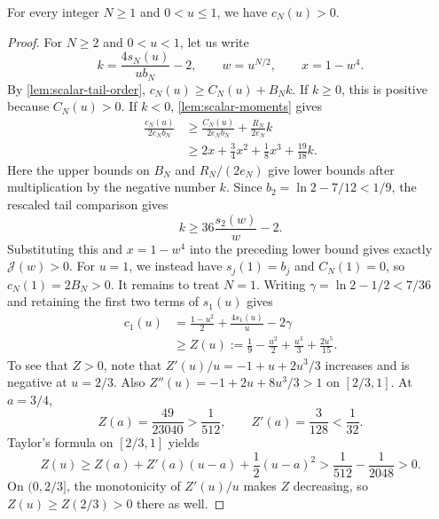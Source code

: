 \begin{lemma}
\label{lem:scalar-coefficients}
For every integer $N\ge1$ and $0<u\le1$, we have $c_N(u)>0$.
\end{lemma}
\begin{proof}
For $N\ge2$ and $0<u<1$, let us write
\begin{equation*}
  k=\frac{4s_N(u)}{u b_N}-2,\qquad
  w=u^{N/2},\qquad x=1-w^4.
\end{equation*}
By \autoref{lem:scalar-tail-order},
$c_N(u)\ge C_N(u)+B_Nk$.
If $k\ge0$, this is positive because $C_N(u)>0$.
If $k<0$, \autoref{lem:scalar-moments} gives
\begin{align*}
  \frac{c_N(u)}{2e_Nb_N}
  &\ge\frac{C_N(u)}{2e_Nb_N}+\frac{R_N}{2e_N}k\\
  &\ge2x+\frac34x^2+\frac18x^3+\frac{19}{18}k.
\end{align*}
Here the upper bounds on $B_N$ and $R_N/(2e_N)$ give lower bounds
after multiplication by the negative number $k$.
Since $b_2=\ln 2-7/12<1/9$, the rescaled tail comparison gives
\begin{equation*}
  k\ge36\frac{s_2(w)}w-2.
\end{equation*}
Substituting this and $x=1-w^4$ into the preceding lower bound
gives exactly $\mathcal J(w)>0$.
For $u=1$, we instead have $s_j(1)=b_j$ and $C_N(1)=0$,
so $c_N(1)=2B_N>0$.
It remains to treat $N=1$.
Writing $\gamma=\ln 2-1/2<7/36$ and retaining the first two terms
of $s_1(u)$ gives
\begin{align*}
  c_1(u)&=\frac{1-u^2}{2}+\frac{4s_1(u)}u-2\gamma\\
  &\ge Z(u):=\frac19-\frac{u^2}{2}
  +\frac{u^3}{3}+\frac{2u^5}{15}.
\end{align*}
To see that $Z>0$, note that
$Z'(u)/u=-1+u+2u^3/3$ increases and is negative at $u=2/3$.
Also $Z''(u)=-1+2u+8u^3/3>1$ on $[2/3,1]$.
At $a=3/4$,
\begin{equation*}
  Z(a)=\frac{49}{23040}>\frac1{512},\qquad
  Z'(a)=\frac3{128}<\frac1{32}.
\end{equation*}
Taylor's formula on $[2/3,1]$ yields
\begin{equation*}
  Z(u)\ge Z(a)+Z'(a)(u-a)+\frac12(u-a)^2
  >\frac1{512}-\frac1{2048}>0.
\end{equation*}
On $(0,2/3]$, the monotonicity of $Z'(u)/u$ makes $Z$
decreasing, so $Z(u)\ge Z(2/3)>0$ there as well.
\end{proof}

